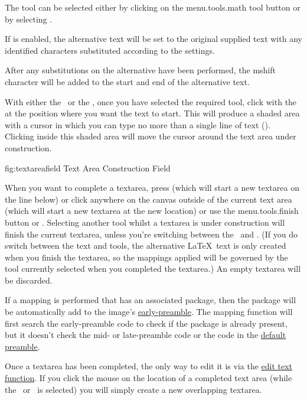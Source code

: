 
The  tool can be selected either by clicking on the
\gls{menu.tools.math} tool button or by selecting .

If  is enabled, the alternative text will be set
to the original supplied text with any identified characters
substituted according to the  settings.

After any substitutions on the alternative have been performed, 
the \gls{mshift} character will be added to the start and end
of the alternative text.


With either the \texttool\ or the \mathstool,
once you have selected the required tool, click with the
 at the position where
you want the text to start. This will produce a shaded area with a
cursor in which you can type no more than a single line of text
().
Clicking inside this shaded area will move the cursor around the
text area under construction.

\FloatFig
  {fig:textareafield}
  {}
  {Text Area Construction Field}

When you want to complete a \gls{textarea}, press
 (which will start a new
\gls{textarea} on the line below) or click anywhere on the canvas
outside of the current text area (which will start a new
\gls{textarea} at the new location) or use the
\gls{menu.tools.finish} button or .  Selecting
another tool whilst a \gls{textarea} is under construction will
finish the current \gls{textarea}, unless you're switching between
the \texttool\ and \mathstool.  (If you do switch between the
text and  tools, the alternative \LaTeX\ text is only
created when you finish the \gls*{textarea}, so the mappings applied
will be governed by the tool currently selected when you completed
the \gls*{textarea}.) An empty \gls{textarea} will be discarded.

If a mapping is performed that has an associated package, then the
package will be automatically add to the image's
\hyperref[sec:preamble]{early-preamble}. The mapping function will
first search the early-preamble code to check if the package is
already present, but it doesn't check the mid- or late-preamble code
or the code in the \hyperref[sec:texconfigpreamble]{default
preamble}.

Once a \gls{textarea} has been completed, the only way to edit it is via the
\hyperref[sec:edittext]{edit text function}. If you click the
mouse on the location of a completed text area (while the
\texttool\ or \mathstool\ is selected) you will simply create a new
overlapping \gls*{textarea}.

